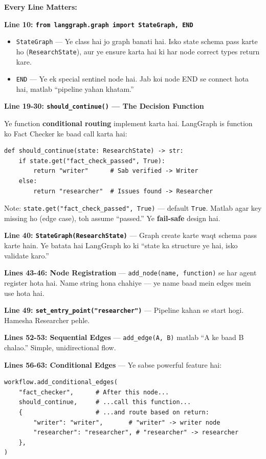 \documentclass[12pt, a4paper]{article}
\begin{document}
\begin{codestorybox}
\textbf{Every Line Matters:}

\textbf{Line 10: \texttt{from langgraph.graph import StateGraph, END}}
\begin{itemize}
\item \texttt{StateGraph} --- Ye class hai jo graph banati hai. Isko state schema pass karte ho (\texttt{ResearchState}), aur ye ensure karta hai ki har node correct types return kare.
\item \texttt{END} --- Ye ek special sentinel node hai. Jab koi node END se connect hota hai, matlab ``pipeline yahan khatam.''
\end{itemize}

\textbf{Line 19-30: \texttt{should\_continue()} --- The Decision Function}

Ye function \textbf{conditional routing} implement karta hai. LangGraph is function ko Fact Checker ke baad call karta hai:
\begin{lstlisting}[style=pythonstyle]
def should_continue(state: ResearchState) -> str:
    if state.get("fact_check_passed", True):
        return "writer"      # Sab verified -> Writer
    else:
        return "researcher"  # Issues found -> Researcher
\end{lstlisting}

Note: \texttt{state.get("fact\_check\_passed", True)} --- default \texttt{True}. Matlab agar key missing ho (edge case), toh assume ``passed.'' Ye \textbf{fail-safe} design hai.

\textbf{Line 40: \texttt{StateGraph(ResearchState)}} --- Graph create karte waqt schema pass karte hain. Ye batata hai LangGraph ko ki ``state ka structure ye hai, isko validate karo.''

\textbf{Lines 43-46: Node Registration} --- \texttt{add\_node(name, function)} se har agent register hota hai. Name string hona chahiye --- ye name baad mein edges mein use hota hai.

\textbf{Line 49: \texttt{set\_entry\_point("researcher")}} --- Pipeline kahan se start hogi. Hamesha Researcher pehle.

\textbf{Lines 52-53: Sequential Edges} --- \texttt{add\_edge(A, B)} matlab ``A ke baad B chalao.'' Simple, unidirectional flow.

\textbf{Lines 56-63: Conditional Edges} --- Ye sabse powerful feature hai:
\begin{lstlisting}[style=pythonstyle]
workflow.add_conditional_edges(
    "fact_checker",      # After this node...
    should_continue,     # ...call this function...
    {                    # ...and route based on return:
        "writer": "writer",       # "writer" -> writer node
        "researcher": "researcher", # "researcher" -> researcher
    },
)
\end{lstlisting}


\end{codestorybox}
\end{document}
